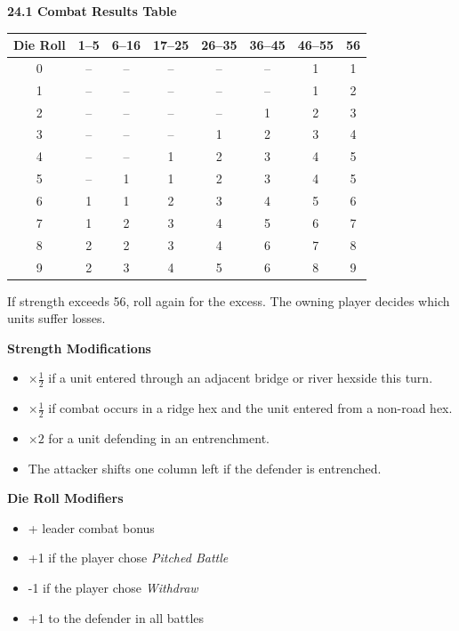 
\noindent
\begin{minipage}[t]{0.56\textwidth}
\textbf{24.1 Combat Results Table}

\vspace{0.4em}
\centering
\scriptsize
\setlength{\tabcolsep}{3pt}
\begin{tabular}{c*{7}{c}}
\toprule
\textbf{Die Roll} & \textbf{1--5} & \textbf{6--16} & \textbf{17--25} & \textbf{26--35} & \textbf{36--45} & \textbf{46--55} & \textbf{56} \\
\midrule
0 & -- & -- & -- & -- & -- & 1 & 1 \\
1 & -- & -- & -- & -- & -- & 1 & 2 \\
2 & -- & -- & -- & -- & 1 & 2 & 3 \\
3 & -- & -- & -- & 1 & 2 & 3 & 4 \\
4 & -- & -- & 1 & 2 & 3 & 4 & 5 \\
5 & -- & 1 & 1 & 2 & 3 & 4 & 5 \\
6 & 1 & 1 & 2 & 3 & 4 & 5 & 6 \\
7 & 1 & 2 & 3 & 4 & 5 & 6 & 7 \\
8 & 2 & 2 & 3 & 4 & 6 & 7 & 8 \\
9 & 2 & 3 & 4 & 5 & 6 & 8 & 9 \\
\bottomrule
\end{tabular}

\vspace{0.5em}
\raggedright
\scriptsize
If strength exceeds 56, roll again for the excess. The owning player decides which units suffer losses.

\textbf{Strength Modifications}
\begin{itemize}
\item $\times \frac{1}{2}$ if a unit entered through an adjacent bridge or river hexside this turn.
\item $\times \frac{1}{2}$ if combat occurs in a ridge hex and the unit entered from a non-road hex.
\item $\times 2$ for a unit defending in an entrenchment.
\item The attacker shifts one column left if the defender is entrenched.
\end{itemize}

\textbf{Die Roll Modifiers}
\begin{itemize}
\item + leader combat bonus
\item +1 if the player chose \textit{Pitched Battle}
\item -1 if the player chose \textit{Withdraw}
\item +1 to the defender in all battles
\end{itemize}
\end{minipage}\hfill
